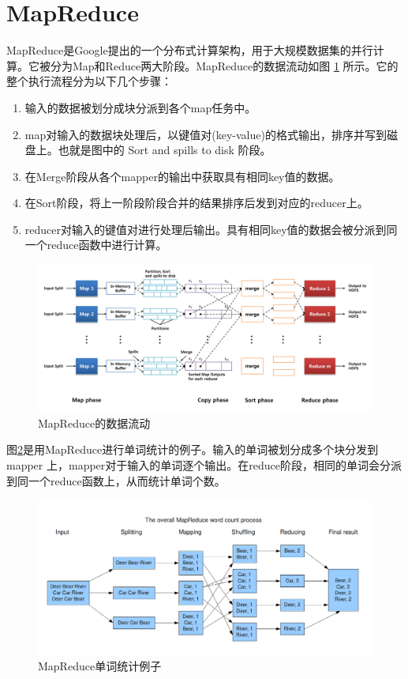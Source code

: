 \section{MapReduce}

MapReduce是Google提出的一个分布式计算架构，用于大规模数据集的并行计算。它被分为Map和Reduce两大阶段。MapReduce的数据流动如图 \ref{mr_data_flow} 所示。它的整个执行流程分为以下几个步骤：

\begin{enumerate}
\item 输入的数据被划分成块分派到各个map任务中。
\item map对输入的数据块处理后，以键值对(key-value)的格式输出，排序并写到磁盘上。也就是图中的 Sort and spills to disk 阶段。
\item 在Merge阶段从各个mapper的输出中获取具有相同key值的数据。
\item 在Sort阶段，将上一阶段阶段合并的结果排序后发到对应的reducer上。
\item reducer对输入的键值对进行处理后输出。具有相同key值的数据会被分派到同一个reduce函数中进行计算。
\end{enumerate}

\begin{figure}[h]
\centering\includegraphics[width=6in]{picture/ch_preliminary/mr_data_flow} 
\caption{MapReduce的数据流动}\label{mr_data_flow} 
\end{figure} 

图\ref{mr_word_count}是用MapReduce进行单词统计的例子。输入的单词被划分成多个块分发到 mapper 上，mapper对于输入的单词逐个输出。在reduce阶段，相同的单词会分派到同一个reduce函数上，从而统计单词个数。

\begin{figure}[!ht]
\centering\includegraphics[width=6in]{picture/ch_preliminary/mr_word_count} 
\caption{MapReduce单词统计例子}\label{mr_word_count} 
\end{figure} 

